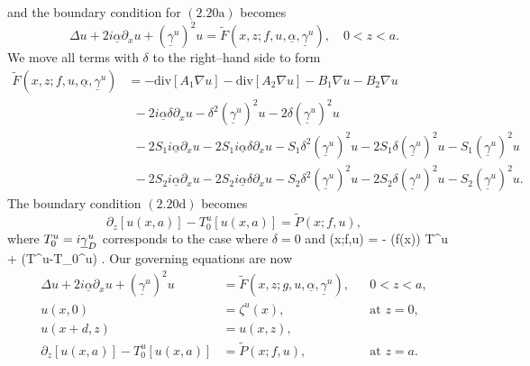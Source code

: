 and the boundary condition for $(2.20\text{a})$ becomes
\begin{equation}\Delta u +2i\underline{\alpha}\partial_{x}u+(\underline{\gamma}^u)^2u=\tilde{F}\left(x,z;f,u,\underline{\alpha},\underline{\gamma}^u\right),\quad\text{$0<z<a$}. \end{equation}
We move all terms with $\delta$ to the right--hand side to form
\begin{align*}\tilde{F}\left(x,z;f,u,\underline{\alpha},\underline{\gamma}^u\right)&=-\text{div}[A_1\nabla u]-\text{div}[A_2\nabla u]-B_1\nabla u - B_2\nabla u\nonumber
\\&~~-2i\underline{\alpha}\delta\partial_xu-\delta^2(\underline{\gamma}^u)^2u-2\delta(\underline{\gamma}^u)^2u\nonumber
\\&~~-2S_1i\underline{\alpha}\partial_xu-2S_1i\underline{\alpha}\delta\partial_xu-S_1\delta^2(\underline{\gamma}^u)^2u-2S_1\delta(\underline{\gamma}^u)^2u-S_1(\underline{\gamma}^u)^2u\nonumber
\\&~~-2S_2i\underline{\alpha}\partial_xu-2S_2i\underline{\alpha}\delta\partial_xu-S_2\delta^2(\underline{\gamma}^u)^2u-2S_2\delta(\underline{\gamma}^u)^2u-S_2(\underline{\gamma}^u)^2u.
\end{align*}
The boundary condition $(2.20\text{d})$ becomes
$$\partial_z \left[u(x,a)\right] - T_0^u[u(x,a)]=\tilde{P}(x;f,u),$$
where $T_0^u = i \underline{\gamma}_D^u$
corresponds to the case where $\delta=0$ and
\bes
{}(x;f,u) = - (\Eps f(x)) T^u \left[ u(x,a) \right]
+ (T^u-T_0^u) \left[ u(x,a) \right].
\ees
Our governing equations are now
\begin{subequations}
\begin{align}
\Delta u +2i\underline{\alpha}\partial_{x}u+(\underline{\gamma}^u)^2u&=\tilde{F}\left(x,z;g,u,\underline{\alpha},\underline{\gamma}^u\right),  &&\text{$0<z<a$}, \\
u(x,0)&=\zeta^u(x),&& \text{at $z=0$},\\
u(x+d,z)&=u(x,z),\\
\partial_z \left[u(x,a)\right] - T_0^u[u(x,a)]&=\tilde{P}(x;f,u),&& \text{at $z=a$}.
\end{align}
\end{subequations}

